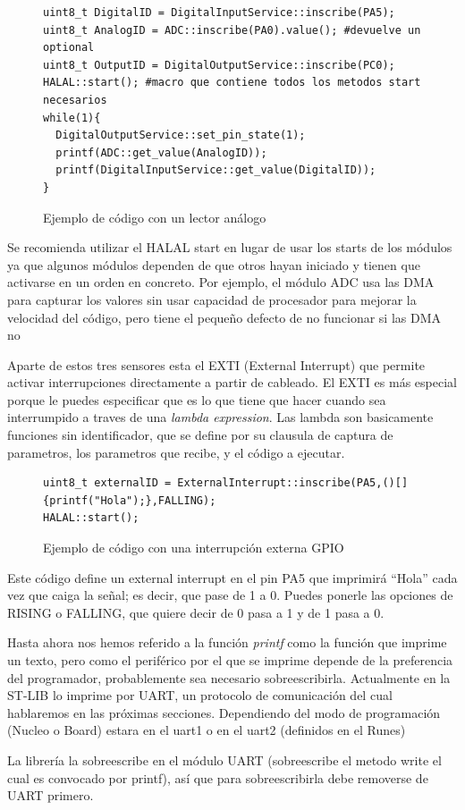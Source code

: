 \documentclass{report}
\begin{document}
\begin{figure}[h]
\begin{lstlisting}
uint8_t DigitalID = DigitalInputService::inscribe(PA5);
uint8_t AnalogID = ADC::inscribe(PA0).value(); #devuelve un optional
uint8_t OutputID = DigitalOutputService::inscribe(PC0);
HALAL::start(); #macro que contiene todos los metodos start necesarios
while(1){
  DigitalOutputService::set_pin_state(1);
  printf(ADC::get_value(AnalogID));
  printf(DigitalInputService::get_value(DigitalID));
}
\end{lstlisting}
\caption{Ejemplo de código con un lector análogo}
  \label{Analogcode}
\end{figure}
\par \vspace{0.3 cm}
Se recomienda utilizar el HALAL start en lugar de usar los starts de los módulos ya que algunos módulos dependen de que otros hayan iniciado y tienen que activarse en un orden en concreto. Por ejemplo, el módulo ADC usa las DMA para capturar los valores sin usar capacidad de procesador para mejorar la velocidad del código, pero tiene el pequeño defecto de no funcionar si las DMA no 
\par \vspace{0.3 cm}
Aparte de estos tres sensores esta el EXTI (External Interrupt) que permite activar interrupciones directamente a partir de cableado. El EXTI es más especial porque le puedes especificar que es lo que tiene que hacer cuando sea interrumpido a traves de una \textit{lambda expression}. Las lambda son basicamente funciones sin identificador, que se define por su clausula de captura de parametros, los parametros que recibe, y el código a ejecutar. 
\begin{figure}[h]
\begin{lstlisting}
uint8_t externalID = ExternalInterrupt::inscribe(PA5,()[]{printf("Hola");},FALLING);
HALAL::start();
\end{lstlisting} 
\caption{Ejemplo de código con una interrupción externa GPIO}
  \label{EXTIcode}
\end{figure}
\par \vspace{0.3 cm}
Este código define un external interrupt en el pin PA5 que imprimirá ``Hola'' cada vez que caiga la señal; es decir, que pase de 1 a 0. Puedes ponerle las opciones de RISING o FALLING, que quiere decir de 0 pasa a 1 y de 1 pasa a 0. \par\vspace{0.3 cm}
Hasta ahora nos hemos referido a la función \textit{printf} como la función que imprime un texto, pero como el periférico por el que se imprime depende de la preferencia del programador, probablemente sea necesario sobreescribirla. Actualmente en la ST-LIB lo imprime por UART, un protocolo de comunicación del cual hablaremos en las próximas secciones. Dependiendo del modo de programación (Nucleo o Board) estara en el uart1 o en el uart2 (definidos en el Runes) \par
La librería la sobreescribe en el módulo UART (sobreescribe el metodo write el cual es convocado por printf), así que para sobreescribirla debe removerse de UART primero.
\end{document}
